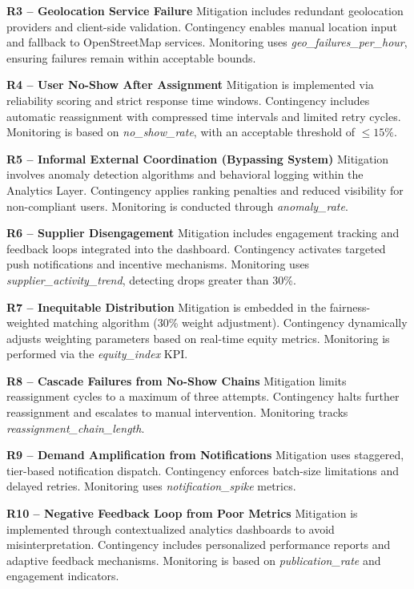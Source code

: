 \documentclass[9pt,conference]{IEEEtran}
\begin{document}
\textbf{R3 – Geolocation Service Failure}  
Mitigation includes redundant geolocation providers and client-side validation.  
Contingency enables manual location input and fallback to OpenStreetMap services.  
Monitoring uses \textit{geo\_failures\_per\_hour}, ensuring failures remain within acceptable bounds.

\textbf{R4 – User No-Show After Assignment}  
Mitigation is implemented via reliability scoring and strict response time windows.  
Contingency includes automatic reassignment with compressed time intervals and limited retry cycles.  
Monitoring is based on \textit{no\_show\_rate}, with an acceptable threshold of $\leq 15\%$.

\textbf{R5 – Informal External Coordination (Bypassing System)}  
Mitigation involves anomaly detection algorithms and behavioral logging within the Analytics Layer.  
Contingency applies ranking penalties and reduced visibility for non-compliant users.  
Monitoring is conducted through \textit{anomaly\_rate}.

\textbf{R6 – Supplier Disengagement}  
Mitigation includes engagement tracking and feedback loops integrated into the dashboard.  
Contingency activates targeted push notifications and incentive mechanisms.  
Monitoring uses \textit{supplier\_activity\_trend}, detecting drops greater than 30\%.

\textbf{R7 – Inequitable Distribution}  
Mitigation is embedded in the fairness-weighted matching algorithm (30\% weight adjustment).  
Contingency dynamically adjusts weighting parameters based on real-time equity metrics.  
Monitoring is performed via the \textit{equity\_index} KPI.

\textbf{R8 – Cascade Failures from No-Show Chains}  
Mitigation limits reassignment cycles to a maximum of three attempts.  
Contingency halts further reassignment and escalates to manual intervention.  
Monitoring tracks \textit{reassignment\_chain\_length}.

\textbf{R9 – Demand Amplification from Notifications}  
Mitigation uses staggered, tier-based notification dispatch.  
Contingency enforces batch-size limitations and delayed retries.  
Monitoring uses \textit{notification\_spike} metrics.

\textbf{R10 – Negative Feedback Loop from Poor Metrics}  
Mitigation is implemented through contextualized analytics dashboards to avoid misinterpretation.  
Contingency includes personalized performance reports and adaptive feedback mechanisms.  
Monitoring is based on \textit{publication\_rate} and engagement indicators.
\end{document}
